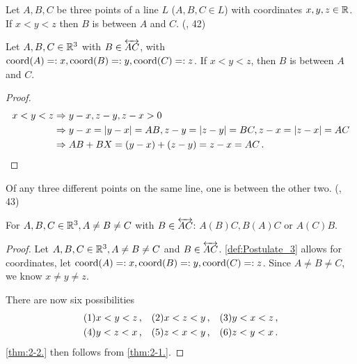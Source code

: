\begin{theorem}[2-1.]\label{thm:2-1.}
  \leanok
  Let $A,B,C$ be three points of a line $L$ ($A,B,C \in L$) with coordinates $x,y,z \in \mathbb{R}$.
  If $x<y<z$ then $B$ is between $A$ and $C$.
  (\cite{SMSGGeometry}, 42)

  Let $A,B,C \in \mathbb{R}^3$ with $B \in \overleftrightarrow{AC}$, with $\operatorname{coord}({A})=:x, \operatorname{coord}({B})=:y, \operatorname{coord}({C})=:z$. If $x<y<z$, then $B$ is between $A$ and $C$.

\end{theorem}

\begin{proof}
  \leanok
    \begin{align*}
      x<y<z &\Rightarrow
                  y-x,z-y,z-x>0 \\
            &\Rightarrow
                  y-x=\left\vert y-x \right\vert=AB, z-y=\left\vert z-y \right\vert=BC, z-x=\left\vert z-x \right\vert=AC \\
            &\Rightarrow
                  AB+BX=(y-x)+(z-y)=z-x=AC \, \text{.}
    \end{align*}
\end{proof}

\begin{theorem}[2-2.]\label{thm:2-2.}
  \leanok
  Of any three different points on the same line, one is between the other two.
  (\cite{SMSGGeometry}, 43)

  For $A,B,C \in \mathbb{R}^3, A\ne B\ne C$ with $B \in \overleftrightarrow{AC}$: $A(B)C, B(A)C$ or $A(C)B$.
\end{theorem}

\begin{proof}
  \leanok
  Let $A,B,C \in \mathbb{R}^3, A\ne B\ne C$ and $B \in \overleftrightarrow{AC}$.
  \ref{def:Postulate_3} allows for coordinates, let $\operatorname{coord}({A})=:x, \operatorname{coord}({B})=:y, \operatorname{coord}({C})=:z$.
  Since $A \ne B \ne C$, we know $x \ne y \ne z$.

  There are now six possibilities
  \begin{align*}
    (1)& x<y<z\, \text{,} & (2)& x<z<y\, \text{,} & (3)& y<x<z \, \text{,} \\
    (4)& y<z<x \, \text{,} & (5)& z<x<y \, \text{,} & (6)& z<y<x \, \text{.}
  \end{align*}
  \ref{thm:2-2.} then follows from \ref{thm:2-1.}.
\end{proof}

